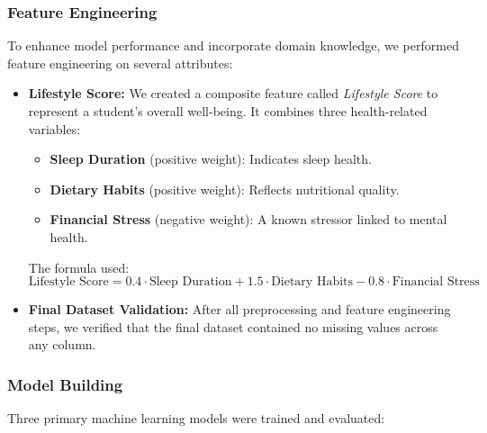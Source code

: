 \documentclass{article} %
\begin{document}
    
\subsubsection*{Feature Engineering}

To enhance model performance and incorporate domain knowledge, we performed feature engineering on several attributes:

\begin{itemize}
    \item \textbf{Lifestyle Score:}  
    We created a composite feature called \textit{Lifestyle Score} to represent a student's overall well-being. It combines three health-related variables:
    \begin{itemize}
        \item \textbf{Sleep Duration} (positive weight): Indicates sleep health.
        \item \textbf{Dietary Habits} (positive weight): Reflects nutritional quality.
        \item \textbf{Financial Stress} (negative weight): A known stressor linked to mental health.
    \end{itemize}

    The formula used:
    \[
    \text{Lifestyle Score} = 0.4 \cdot \text{Sleep Duration} + 1.5 \cdot \text{Dietary Habits} - 0.8 \cdot \text{Financial Stress}
    \]

    \item \textbf{Final Dataset Validation:}  
    After all preprocessing and feature engineering steps, we verified that the final dataset contained no missing values across any column.
\end{itemize}

    
\subsubsection*{Model Building}

Three primary machine learning models were trained and evaluated:
\end{document}
